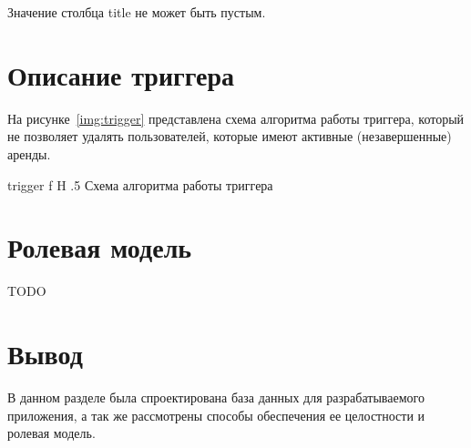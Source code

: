 Значение столбца title не может быть пустым.

\section{Описание триггера}

На рисунке~\ref{img:trigger} представлена схема алгоритма работы триггера, который не позволяет удалять пользователей, которые имеют активные (незавершенные) аренды.

{trigger}
{f}
{H}
{.5\textwidth}
{Схема алгоритма работы триггера}

\section{Ролевая модель}

TODO

\section*{Вывод}

В данном разделе была спроектирована база данных для разрабатываемого приложения, а так же рассмотрены способы обеспечения ее целостности и ролевая модель.